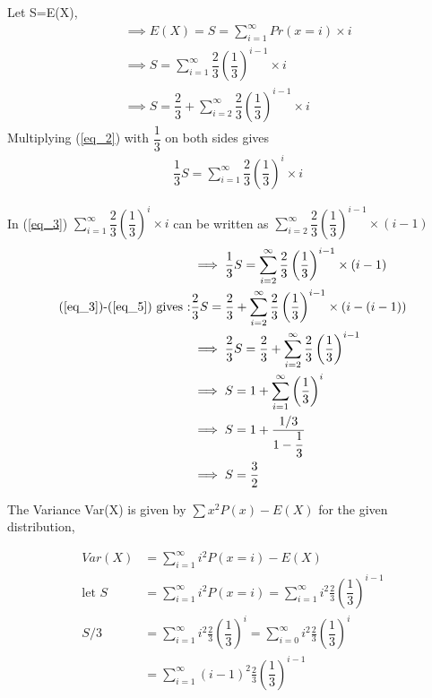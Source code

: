 \documentclass[a4paper]{article}
\begin{document}
\begin{multicols*}{2}
Let S=E(X),
\begin{align}
&\implies E(X)=S=\sum_{i=1}^{\infty} Pr(x=i)\times i\\
&\implies S=\sum_{i=1}^{\infty} \dfrac{2}{3}\left(\dfrac{1}{3}\right)^{i-1} \times i \label{eq_2}   \\
&\implies S=\dfrac{2}{3}+\sum_{i=2}^{\infty} \dfrac{2}{3}\left(\dfrac{1}{3}\right)^{i-1} \times i  \label{eq_3}
\end{align}
Multiplying (\ref{eq_2}) with  $\dfrac{1}{3}$ on both sides gives
\begin{align}
&\dfrac{1}{3}S=\sum_{i=1}^{\infty} \dfrac{2}{3}\left(\dfrac{1}{3}\right)^{i} \times i \label{eq_4}
\end{align}

In (\ref{eq_3})	$\sum_{i=1}^{\infty} \dfrac{2}{3}\left(\dfrac{1}{3}\right)^{i} \times i$ can be written as $\sum_{i=2}^{\infty} \dfrac{2}{3}\left(\dfrac{1}{3}\right)^{i-1} \times (i-1)$
\begin{align}
& \implies \dfrac{1}{3}S=\sum_{i=2}^{\infty} \dfrac{2}{3}\left(\dfrac{1}{3}\right)^{i-1} \times (i-1) \label{eq_5} \\
\text{(\ref{eq_3})-(\ref{eq_5}) gives :}& \dfrac{2}{3}S=\dfrac{2}{3}+\sum_{i=2}^{\infty} \dfrac{2}{3}\left(\dfrac{1}{3}\right)^{i-1} \times (i-(i-1))\\
&\implies  \dfrac{2}{3}S=\dfrac{2}{3}+\sum_{i=2}^{\infty} \dfrac{2}{3}\left(\dfrac{1}{3}\right)^{i-1}\\
& \implies S=1+\sum_{i=1}^{\infty}\left(\dfrac{1}{3}\right)^{i}\\
& \implies S=1+\dfrac{1/3}{1-\dfrac{1}{3}}\\
& \implies S=\dfrac{3}{2} \label{eq_10}
\end{align}

The Variance Var(X) is given by $\sum x^2 P(x) - E(X)$ for the given distribution,

\begin{align}
Var(X) & =\sum_{i=1}^{\infty} i^2P(x=i) - E(X)\label{eq_11}\\
\text{let } S & = \sum_{i=1}^{\infty} i^2P(x=i)=\sum_{i=1}^{\infty} i^2 \frac{2}{3}\left(\dfrac{1}{3}\right)^{i-1} \label{eq_12}\\
S/3&= \sum_{i=1}^{\infty} i^2 \frac{2}{3}\left(\dfrac{1}{3}\right)^{i}=\sum_{i=0}^{\infty} i^2 \frac{2}{3}\left(\dfrac{1}{3}\right)^{i}\\
& = \sum_{i=1}^{\infty} (i-1)^2 \frac{2}{3}\left(\dfrac{1}{3}\right)^{i-1}\label{eq_14}
\end{align}


\end{multicols*}
\end{document}
